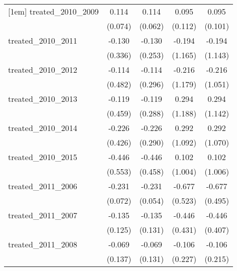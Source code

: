 {\begin{tabular}{l*{4}{c}}
[1em]
treated\_2010\_2009&       0.114         &       0.114         &       0.095         &       0.095         \\
            &     (0.074)         &     (0.062)         &     (0.112)         &     (0.101)         \\
[1em]
treated\_2010\_2011&      -0.130         &      -0.130         &      -0.194         &      -0.194         \\
            &     (0.336)         &     (0.253)         &     (1.165)         &     (1.143)         \\
[1em]
treated\_2010\_2012&      -0.114         &      -0.114         &      -0.216         &      -0.216         \\
            &     (0.482)         &     (0.296)         &     (1.179)         &     (1.051)         \\
[1em]
treated\_2010\_2013&      -0.119         &      -0.119         &       0.294         &       0.294         \\
            &     (0.459)         &     (0.288)         &     (1.188)         &     (1.142)         \\
[1em]
treated\_2010\_2014&      -0.226         &      -0.226         &       0.292         &       0.292         \\
            &     (0.426)         &     (0.290)         &     (1.092)         &     (1.070)         \\
[1em]
treated\_2010\_2015&      -0.446         &      -0.446         &       0.102         &       0.102         \\
            &     (0.553)         &     (0.458)         &     (1.004)         &     (1.006)         \\
[1em]
treated\_2011\_2006&      -0.231\sym{**} &      -0.231\sym{***}&      -0.677         &      -0.677         \\
            &     (0.072)         &     (0.054)         &     (0.523)         &     (0.495)         \\
[1em]
treated\_2011\_2007&      -0.135         &      -0.135         &      -0.446         &      -0.446         \\
            &     (0.125)         &     (0.131)         &     (0.431)         &     (0.407)         \\
[1em]
treated\_2011\_2008&      -0.069         &      -0.069         &      -0.106         &      -0.106         \\
            &     (0.137)         &     (0.131)         &     (0.227)         &     (0.215)         \\

\end{tabular}}

